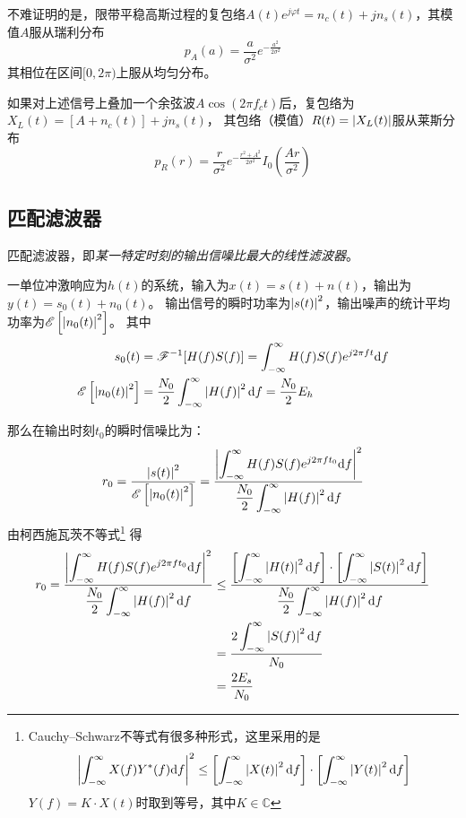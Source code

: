     不难证明的是，限带平稳高斯过程的复包络$A(t)e^{j\varphi{t}}=n_c(t)+jn_s(t)$，其模值$A$服从瑞利分布
    \begin{equation}
        p_A(a)=\frac{a}{\sigma^2}e^{-\frac{a^2}{2\sigma^2}}
    \end{equation}
    其相位在区间$[0,2\pi)$上服从均匀分布。

    如果对上述信号上叠加一个余弦波$A\cos(2\pi f_ct)$后，复包络为$X_L(t)=[A+n_c(t)]+jn_s(t)$，
    其包络（模值）$R(t)=\left\vert X_L(t) \right\vert$服从莱斯分布
    \begin{equation}
        p_R(r)=\frac{r}{\sigma^2}e^{-\frac{r^2+A^2}{2\sigma^2}}I_0\left(\frac{Ar}{\sigma^2}\right)
    \end{equation}

\subsection{匹配滤波器}
    匹配滤波器，即\emph{某一特定时刻的输出信噪比最大的线性滤波器}。
    
    一单位冲激响应为$h(t)$的系统，输入为$x(t)=s(t)+n(t)$，输出为$y(t)=s_0(t)+n_0(t)$。
    输出信号的瞬时功率为$\left\vert s(t) \right\vert^2$，输出噪声的统计平均功率为$\mathscr{E}\left[\left\vert n_0(t) \right\vert^2\right]$。
    其中
    \begin{align}
        s_0(t)&=\mathscr{F}^{-1}[H(f)S(f)]=\int_{-\infty}^{\infty}H(f)S(f)e^{j2\pi ft}\text{\upshape d} f\\
        \mathscr{E}\left[\left\vert n_0(t) \right\vert^2\right]&=\frac{N_0}{2}\int_{-\infty}^{\infty}\left\vert H(f) \right\vert^2\text{\upshape d} f=\frac{N_0}{2}E_h
    \end{align}

    那么在输出时刻$t_0$的瞬时信噪比为：
    \begin{equation}
        r_0=\frac{\left\vert s(t) \right\vert^2}{\mathscr{E}\left[\left\vert n_0(t) \right\vert^2\right]}=\frac{\left\vert \displaystyle\int_{-\infty}^{\infty}H(f)S(f)e^{j2\pi ft_0}\text{\upshape d} f \right\vert^2}{\dfrac{N_0}{2}\displaystyle\int_{-\infty}^{\infty}\left\vert H(f) \right\vert^2\text{\upshape d} f}
    \end{equation}
    由柯西施瓦茨不等式\footnote{Cauchy--Schwarz不等式有很多种形式，这里采用的是\begin{equation*}
        \left\vert \int_{-\infty}^{\infty}X(f)Y^*(f)\text{\upshape d} f \right\vert^2\leq \left[\int_{-\infty}^{\infty}\left\vert X(t) \right\vert^2\text{\upshape d} f\right]\cdot\left[\int_{-\infty}^{\infty}\left\vert Y(t) \right\vert^2\text{\upshape d} f\right]
    \end{equation*}
    $Y(f)=K\cdot X(t)$时取到等号，其中$K\in\mathbb{C}$}
    得
    \begin{equation}
        \begin{split}
            r_0=\frac{\left\vert \displaystyle\int_{-\infty}^{\infty}H(f)S(f)e^{j2\pi ft_0}\text{\upshape d} f \right\vert^2}{\dfrac{N_0}{2}\displaystyle\int_{-\infty}^{\infty}\left\vert H(f) \right\vert^2\text{\upshape d} f}&\leq\frac{\left[\displaystyle\int_{-\infty}^{\infty}\left\vert H(t) \right\vert^2\text{\upshape d} f\right]\cdot\left[\displaystyle\int_{-\infty}^{\infty}\left\vert S(t) \right\vert^2\text{\upshape d} f\right]}{\dfrac{N_0}{2}\displaystyle\int_{-\infty}^{\infty}\left\vert H(f) \right\vert^2\text{\upshape d} f}\\
            &=\frac{2\displaystyle\int_{-\infty}^{\infty}\left\vert S(f) \right\vert^2\text{\upshape d} f}{N_0}\\
            &=\frac{2E_s}{N_0}
        \end{split}
    \end{equation}

